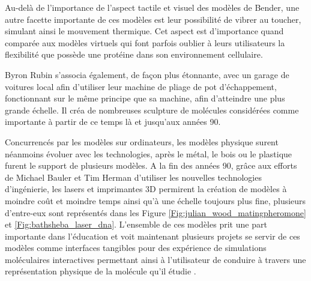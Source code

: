 Au-delà de l'importance de l'aspect tactile et visuel des modèles de Bender, une autre facette importante de ces modèles est leur possibilité de vibrer au toucher, simulant ainsi le mouvement thermique. Cet aspect est d'importance quand comparée aux modèles virtuels qui font parfois oublier à leurs utilisateurs la flexibilité que possède une protéine dans son environnement cellulaire. 

Byron Rubin s'associa également, de façon plus étonnante, avec un garage de voitures local afin d'utiliser leur machine de pliage de pot d'échappement, fonctionnant sur le même principe que sa machine, afin d'atteindre une plus grande échelle. Il créa de nombreuses sculpture de molécules considérées comme importante à partir de ce temps là et jusqu'aux années 90.

Concurrencés par les modèles sur ordinateurs, les modèles physique surent néanmoins évoluer avec les technologies, après le métal, le bois ou le plastique furent le support de plusieurs modèles. A la fin des années 90, grâce aux efforts de Michael Bauler et Tim Herman d'utiliser les nouvelles technologies d’ingénierie, les lasers et imprimantes 3D permirent la création de modèles à moindre coût et moindre temps ainsi qu'à une échelle toujours plus fine, plusieurs d'entre-eux sont représentés dans les Figure \ref{Fig:julian_wood_matingpheromone} et \ref{Fig:bathsheba_laser_dna}. L'ensemble de ces modèles prit une part importante dans l'éducation et voit maintenant plusieurs projets se servir de ces modèles comme interfaces tangibles pour des expérience de simulations moléculaires interactives permettant ainsi à l'utilisateur de conduire à travers une représentation physique de la molécule qu'il étudie \cite{gillet2005tangible}.


